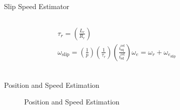 \begin{frame}{Slip Speed Estimator}
	\begin{columns}
		\begin{figure}
			\centering
		\end{figure}
		\begin{equation*}
			\begin{gathered}
				\tau_r = \left(\frac{L_r}{R_r}\right) \\[0.5em]
				\omega_\text{slip} = \left(\frac{1}{p}\right)\left(\frac{1}{\tau_r}\right)\left(\frac{i_\text{sq}^\text{ref}}{i_\text{sd}^\text{ref}}\right)
				\omega_e = \omega_r + \omega_{e_\text{slip}} \\[0.5em]
			\end{gathered}
		\end{equation*}
	\end{columns}
\end{frame}

\begin{frame}{Position and Speed Estimation}
	\begin{figure}
		\centering

		\caption{Position and Speed Estimation}
	\end{figure}
\end{frame}

